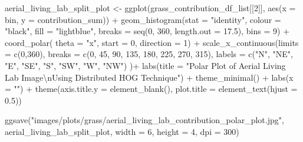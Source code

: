 \documentclass[
  letterpaper,
  DIV=11,
  numbers=noendperiod]{scrreprt}
\newenvironment{Shaded}{\begin{snugshade}}{\end{snugshade}}
\newcommand{\AttributeTok}[1]{\textcolor[rgb]{0.40,0.45,0.13}{#1}}
\newcommand{\DecValTok}[1]{\textcolor[rgb]{0.68,0.00,0.00}{#1}}
\newcommand{\FloatTok}[1]{\textcolor[rgb]{0.68,0.00,0.00}{#1}}
\newcommand{\FunctionTok}[1]{\textcolor[rgb]{0.28,0.35,0.67}{#1}}
\newcommand{\NormalTok}[1]{\textcolor[rgb]{0.00,0.23,0.31}{#1}}
\newcommand{\OtherTok}[1]{\textcolor[rgb]{0.00,0.23,0.31}{#1}}
\newcommand{\SpecialCharTok}[1]{\textcolor[rgb]{0.37,0.37,0.37}{#1}}
\newcommand{\StringTok}[1]{\textcolor[rgb]{0.13,0.47,0.30}{#1}}
\begin{document}
\begin{Shaded}
\begin{Highlighting}[]
\NormalTok{aerial\_living\_lab\_split\_plot }\OtherTok{\textless{}{-}}
  \FunctionTok{ggplot}\NormalTok{(grass\_contribution\_df\_list[[}\DecValTok{2}\NormalTok{]], }
         \FunctionTok{aes}\NormalTok{(}\AttributeTok{x =}\NormalTok{ bin, }\AttributeTok{y =}\NormalTok{ contribution\_sum)) }\SpecialCharTok{+}
  \FunctionTok{geom\_histogram}\NormalTok{(}\AttributeTok{stat =} \StringTok{"identity"}\NormalTok{,}
                 \AttributeTok{colour =} \StringTok{"black"}\NormalTok{, }
                 \AttributeTok{fill =} \StringTok{"lightblue"}\NormalTok{, }
                 \AttributeTok{breaks =} \FunctionTok{seq}\NormalTok{(}\DecValTok{0}\NormalTok{, }\DecValTok{360}\NormalTok{, }\AttributeTok{length.out =} \FloatTok{17.5}\NormalTok{),}
                 \AttributeTok{bins =} \DecValTok{9}\NormalTok{) }\SpecialCharTok{+}
  \FunctionTok{coord\_polar}\NormalTok{(}
    \AttributeTok{theta =} \StringTok{"x"}\NormalTok{, }
    \AttributeTok{start =} \DecValTok{0}\NormalTok{, }
    \AttributeTok{direction =} \DecValTok{1}\NormalTok{) }\SpecialCharTok{+}
  \FunctionTok{scale\_x\_continuous}\NormalTok{(}\AttributeTok{limits =} \FunctionTok{c}\NormalTok{(}\DecValTok{0}\NormalTok{,}\DecValTok{360}\NormalTok{),}
    \AttributeTok{breaks =} \FunctionTok{c}\NormalTok{(}\DecValTok{0}\NormalTok{, }\DecValTok{45}\NormalTok{, }\DecValTok{90}\NormalTok{, }\DecValTok{135}\NormalTok{, }\DecValTok{180}\NormalTok{, }\DecValTok{225}\NormalTok{, }\DecValTok{270}\NormalTok{, }\DecValTok{315}\NormalTok{), }
    \AttributeTok{labels =} \FunctionTok{c}\NormalTok{(}\StringTok{"N"}\NormalTok{, }\StringTok{"NE"}\NormalTok{, }\StringTok{"E"}\NormalTok{, }\StringTok{"SE"}\NormalTok{, }\StringTok{"S"}\NormalTok{, }\StringTok{"SW"}\NormalTok{, }\StringTok{"W"}\NormalTok{, }\StringTok{"NW"}\NormalTok{)}
\NormalTok{  )}\SpecialCharTok{+}
  \FunctionTok{labs}\NormalTok{(}\AttributeTok{title =} \StringTok{"Polar Plot of Aerial Living Lab Image}\SpecialCharTok{\textbackslash{}n}\StringTok{Using Distributed HOG Technique"}\NormalTok{) }\SpecialCharTok{+}
  \FunctionTok{theme\_minimal}\NormalTok{() }\SpecialCharTok{+}
  \FunctionTok{labs}\NormalTok{(}\AttributeTok{x =} \StringTok{""}\NormalTok{) }\SpecialCharTok{+}
  \FunctionTok{theme}\NormalTok{(}\AttributeTok{axis.title.y =} \FunctionTok{element\_blank}\NormalTok{(),}
        \AttributeTok{plot.title =} \FunctionTok{element\_text}\NormalTok{(}\AttributeTok{hjust =} \FloatTok{0.5}\NormalTok{))}

\FunctionTok{ggsave}\NormalTok{(}\StringTok{"images/plots/grass/aerial\_living\_lab\_contribution\_polar\_plot.jpg"}\NormalTok{, aerial\_living\_lab\_split\_plot, }\AttributeTok{width =} \DecValTok{6}\NormalTok{, }\AttributeTok{height =} \DecValTok{4}\NormalTok{, }\AttributeTok{dpi =} \DecValTok{300}\NormalTok{)}
\end{Highlighting}
\end{Shaded}
\end{document}
